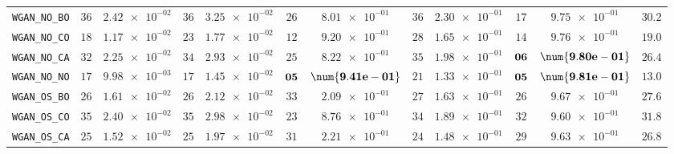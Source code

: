 \begin{table}[H]
\begin{tabularx}{\textwidth}{l||cC|cC|cC|cC|cC||c}
		\texttt{WGAN\_NO\_BO} & $ 36$ & $ \num{2.42e-02}$ & $ 36$ & $ \num{3.25e-02}$ & $ 26$ & $ \num{8.01e-01}$ & $ 36$ & $ \num{2.30e-01}$ & $ 17$ & $ \num{9.75e-01}$ & $ 30.2$  \\
		\texttt{WGAN\_NO\_CO} & $ 18$ & $ \num{1.17e-02}$ & $ 23$ & $ \num{1.77e-02}$ & $ 12$ & $ \num{9.20e-01}$ & $ 28$ & $ \num{1.65e-01}$ & $ 14$ & $ \num{9.76e-01}$ & $ 19.0$  \\
		\texttt{WGAN\_NO\_CA} & $ 32$ & $ \num{2.25e-02}$ & $ 34$ & $ \num{2.93e-02}$ & $ 25$ & $ \num{8.22e-01}$ & $ 35$ & $ \num{1.98e-01}$ & $\bf 06$ & $\bf \num{9.80e-01}$ & $ 26.4$  \\
		\texttt{WGAN\_NO\_NO} & $ 17$ & $ \num{9.98e-03}$ & $ 17$ & $ \num{1.45e-02}$ & $\bf 05$ & $\bf \num{9.41e-01}$ & $ 21$ & $ \num{1.33e-01}$ & $\bf 05$ & $\bf \num{9.81e-01}$ & $ 13.0$  \\
		\texttt{WGAN\_OS\_BO} & $ 26$ & $ \num{1.61e-02}$ & $ 26$ & $ \num{2.12e-02}$ & $ 33$ & $ \num{2.09e-01}$ & $ 27$ & $ \num{1.63e-01}$ & $ 26$ & $ \num{9.67e-01}$ & $ 27.6$  \\
		\texttt{WGAN\_OS\_CO} & $ 35$ & $ \num{2.40e-02}$ & $ 35$ & $ \num{2.98e-02}$ & $ 23$ & $ \num{8.76e-01}$ & $ 34$ & $ \num{1.89e-01}$ & $ 32$ & $ \num{9.60e-01}$ & $ 31.8$  \\
		\texttt{WGAN\_OS\_CA} & $ 25$ & $ \num{1.52e-02}$ & $ 25$ & $ \num{1.97e-02}$ & $ 31$ & $ \num{2.21e-01}$ & $ 24$ & $ \num{1.48e-01}$ & $ 29$ & $ \num{9.63e-01}$ & $ 26.8$  \\

\end{tabularx}
\end{table}
